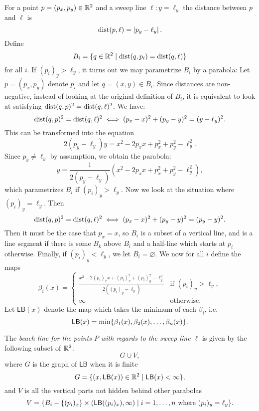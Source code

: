 For a point $p = (p_x, p_y) \in \mathbb{R}^2$ and a sweep line $\ell \colon y = \ell_y$ the distance between $p$ and $\ell$ is
\[
    \operatorname{dist}(p, \ell) = \left\lvert p_y - \ell_y \right\rvert.
\]
Define
\[
    B_i = \{q \in \mathbb{R}^2 \mid \operatorname{dist}(q, p_i) = \operatorname{dist}(q, \ell)\}
\]
for all $i$. If $(p_i)_y > \ell_y$, it turns out we may parametrize $B_i$ by a parabola: Let $p = (p_x, p_y)$ denote $p_i$ and let $q = (x, y) \in B_i$. Since distances are non-negative, instead of looking at the original definition of $B_i$, it is equivalent to look at satisfying $\operatorname{dist}(q, p)^2 = \operatorname{dist}(q, \ell)^2$. We have:
\[
    \operatorname{dist}(q, p)^2 = \operatorname{dist}(q, \ell)^2 \iff (p_x - x)^2 + (p_y - y)^2 = (y - \ell_y)^2.
\]
This can be transformed into the equation
\begin{equation}
    2 (p_y - \ell_y) y = x^2 - 2 p_x x + p_x^2 + p_y^2 - \ell_y^2.
\end{equation}
Since $p_y \ne \ell_y$ by assumption, we obtain the parabola:
\begin{equation} \label{eq:parabola}
    y = \frac{1}{2 (p_y - \ell_y)} (x^2 - 2 p_x x + p_x^2 + p_y^2 - \ell_y^2),
\end{equation}
which parametrizes $B_i$ if $(p_i)_y > \ell_y$. Now we look at the situation where $(p_i)_y = \ell_y$. Then
\[
    \operatorname{dist}(q, p)^2 = \operatorname{dist}(q, \ell)^2 \iff (p_x - x)^2 + (p_y - y)^2 = (p_y - y)^2.
\]
Then it must be the case that $p_x = x$, so $B_i$ is a subset of a vertical line, and is a line segment if there is some $B_k$ above $B_i$ and a half-line which starts at $p_i$ otherwise. Finally, if $(p_i)_y < \ell_y$, we let $B_i = \varnothing$. We now for all $i$ define the maps
\[
    \beta_i(x) = \begin{cases}
        \displaystyle \frac{x^2 - 2 (p_i)_x x + (p_i)_x^2 + (p_i)_y^2 - \ell_y^2}{2 ((p_i)_y - \ell_y)} & \text{if } (p_i)_y > \ell_y, \\
        \infty & \text{otherwise.}
    \end{cases}
\]
Let $\textsf{LB}(x)$ denote the map which takes the minimum of each $\beta_i$, i.e.
\[
    \textsf{LB}(x) = \min\{\beta_1(x), \beta_2(x), \ldots, \beta_n(x)\}.
\]
\begin{defn}
The \emph{beach line for the points $P$ with regards to the sweep line $\ell$} is given by the following subset of $\mathbb{R}^2$:
\[
    G \cup V,
\]
where $G$ is the graph of $\textsf{LB}$ when it is finite
\[
    G = \{(x, \textsf{LB}(x)) \in \mathbb{R}^2 \mid \textsf{LB}(x) < \infty\},
\]
and $V$ is all the vertical parts not hidden behind other parabolas
\[
    V = \{B_i - \{(p_i)_x\} \times (\textsf{LB}((p_i)_x), \infty) \mid i = 1, \ldots, n \text{ where } (p_i)_y = \ell_y\}.
\]
\end{defn}
